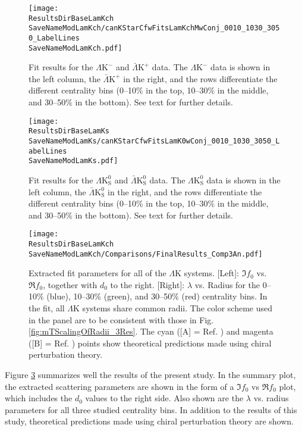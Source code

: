 \documentclass[ALICE,manyauthors]{cernphprep}
\newcommand{\ResultsDirBaseLamKch}{/home/jesse/Analysis/FemtoAnalysis/Results/Results_cLamcKch_20180505/}
\newcommand{\ResultsDirBaseLamKs}{/home/jesse/Analysis/FemtoAnalysis/Results/Results_cLamK0_20180505/}
\newcommand{\MomRes}{_MomResCrctn}%
\newcommand{\NonFlatBgdLamKch}{_NonFlatBgdCrctnLamK0LinearLamKchPolynomial}
\newcommand{\NonFlatBgdLamKs}{_NonFlatBgdCrctnLamK0LinearLamKchPolynomial}
\newcommand{\ResNum}{_3Res}
\newcommand{\PrimMaxDecay}{_PrimMaxDecay10fm}
\newcommand{\ResMethod}{_UsingXiDataAndCoulombOnly}
\newcommand{\ParamFixAndShareLamKch}{_ShareLam_Dualie_ShareLam_ShareRadii}
\newcommand{\ParamFixAndShareLamKs}{_ShareLam_Dualie_ShareLam_ShareRadii}
\newcommand{\SaveNameModLamKch}{\MomRes\NonFlatBgdLamKch\ResNum\PrimMaxDecay\ResMethod\ParamFixAndShareLamKch}
\newcommand{\SaveNameModLamKs}{\MomRes\NonFlatBgdLamKs\ResNum\PrimMaxDecay\ResMethod\ParamFixAndShareLamKs}
\newcommand{\LamK}{$\Lambda$K\xspace}
\newcommand{\LamKchM}{$\Lambda\mathrm{K^{-}}$\xspace}
\newcommand{\ALamKchP}{$\bar{\Lambda}\mathrm{K^{+}}$\xspace}
\newcommand{\LamKchMALamKchP}{$\Lambda\mathrm{K^{-}}$($\bar{\Lambda}\mathrm{K^{+}}$)\xspace}
\newcommand{\LamKs}{$\Lambda\mathrm{K^{0}_{S}}$\xspace}
\newcommand{\ALamKs}{$\bar{\Lambda}\mathrm{K^{0}_{S}}$\xspace}
\newcommand{\LamALamKs}{$\Lambda$($\bar{\Lambda}$)$\mathrm{K^{0}_{S}}$\xspace}
\begin{document}
\begin{figure}[h!]
  \centering
  \texttt{[image: \\ResultsDirBaseLamKch\\SaveNameModLamKch/canKStarCfwFitsLamKchMwConj\_0010\_1030\_3050\_LabelLines\\SaveNameModLamKch.pdf]}
  \caption[\LamKchMALamKchP data with fits]
  {
  Fit results for the \LamKchM and \ALamKchP data.
  The \LamKchM data is shown in the left column, the \ALamKchP in the right, and the rows differentiate the different centrality bins (0--10\% in the top, 10--30\% in the middle, and 30--50\% in the bottom).
 See text for further details.
 }
  \label{fig:LamKchMwConjFits_3Res}
\end{figure}


\begin{figure}[h!]
  \centering
  \texttt{[image: \\ResultsDirBaseLamKs\\SaveNameModLamKs/canKStarCfwFitsLamK0wConj\_0010\_1030\_3050\_LabelLines\\SaveNameModLamKs.pdf]}
  \caption[\LamALamKs data with fits]
  {
  Fit results for the \LamKs and \ALamKs data.
  The \LamKs data is shown in the left column, the \ALamKs in the right, and the rows differentiate the different centrality bins (0--10\% in the top, 10--30\% in the middle, and 30--50\% in the bottom).
 See text for further details.
 }
  \label{fig:LamK0wConjFits_3Res}
\end{figure}




\begin{figure}[h]
  \centering
  \texttt{[image: \\ResultsDirBaseLamKch\\SaveNameModLamKch/Comparisons/FinalResults\_Comp3An.pdf]}
  \caption[Extracted Scattering Parameters]
  {
  Extracted fit parameters for all of the \LamK systems.  
  [Left]: $\Im f_{0}$ vs. $\Re f_{0}$, together with $d_{0}$ to the right.  
  [Right]: $\lambda$ vs. Radius for the 0--10\% (blue), 10--30\% (green), and 30--50\% (red) centrality bins.  
  In the fit, all \LamK systems share common radii.
  The color scheme used in the panel are to be consistent with those in Fig. \ref{fig:mTScalingOfRadii_3Res}.
  The cyan ([A] = Ref. \cite{Liu:2006xja}) and magenta ([B] = Ref. \cite{Mai:2009ce}) points show theoretical predictions made using chiral perturbation theory.
  }
  \label{fig:ScattParams_3Res}
\end{figure}

Figure \ref{fig:ScattParams_3Res} summarizes well the results of the present study.
In the summary plot, the extracted scattering parameters are shown in the form of a $\Im f_{0}$ vs $\Re f_{0}$ plot, which includes the $d_{0}$ values to the right side.  
Also shown are the $\lambda$ vs. radius parameters for all three studied centrality bins. 
In addition to the results of this study, theoretical predictions made using chiral perturbation theory \cite{Liu:2006xja,Mai:2009ce} are shown.
\end{document}
